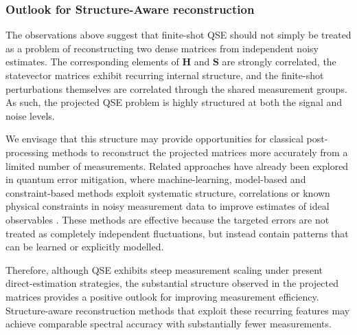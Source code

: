 \subsubsection{Outlook for Structure-Aware reconstruction}
The observations above suggest that finite-shot QSE should not simply be treated as a problem of reconstructing two dense matrices from independent noisy estimates. 
The corresponding elements of $\mathbf{H}$ and $\mathbf{S}$ are strongly correlated, the statevector matrices exhibit recurring internal structure, and the finite-shot perturbations themselves are correlated through the shared measurement groups. 
As such, the projected QSE problem is highly structured at both the signal and noise levels.

We envisage that this structure may provide opportunities for classical post-processing methods to reconstruct the projected matrices more accurately from a limited number of measurements. 
Related approaches have already been explored in quantum error mitigation, where machine-learning, model-based and constraint-based methods exploit systematic structure, correlations or known physical constraints in noisy measurement data to improve estimates of ideal observables \cite{Liao2024MLQEM, Aasen2025ReadoutMitigation, Wang2026RDMErrorPostProcessing}. 
These methods are effective because the targeted errors are not treated as completely independent fluctuations, but instead contain patterns that can be learned or explicitly modelled. 

Therefore, although QSE exhibits steep measurement scaling under present direct-estimation strategies, the substantial structure observed in the projected matrices provides a positive outlook for improving measurement efficiency. 
Structure-aware reconstruction methods that exploit these recurring features may achieve comparable spectral accuracy with substantially fewer measurements.